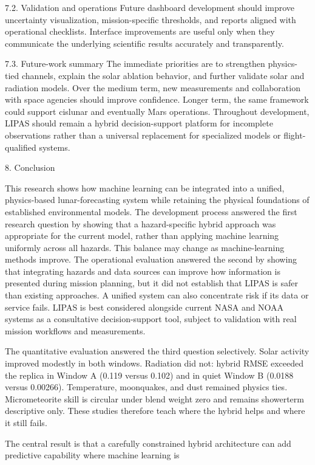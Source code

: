 7.2. Validation and operations Future dashboard development should improve uncertainty visualization, mission-specific thresholds, and reports aligned with operational checklists. Interface improvements are useful only when they communicate the underlying scientific results accurately and transparently.

7.3. Future-work summary The immediate priorities are to strengthen physics-tied channels, explain the solar ablation behavior, and further validate solar and radiation models. Over the medium term, new measurements and collaboration with space agencies should improve confidence. Longer term, the same framework could support cislunar and eventually Mars operations. Throughout development, LIPAS should remain a hybrid decision-support platform for incomplete observations rather than a universal replacement for specialized models or flight-qualified systems.

8. Conclusion

This research shows how machine learning can be integrated into a unified, physics-based lunar-forecasting system while retaining the physical foundations of established environmental models. The development process answered the first research question by showing that a hazard-specific hybrid approach was appropriate for the current model, rather than applying machine learning uniformly across all hazards. This balance may change as machine-learning methods improve. The operational evaluation answered the second by showing that integrating hazards and data sources can improve how information is presented during mission planning, but it did not establish that LIPAS is safer than existing approaches. A unified system can also concentrate risk if its data or service fails. LIPAS is best considered alongside current NASA and NOAA systems as a consultative decision-support tool, subject to validation with real mission workflows and measurements.

The quantitative evaluation answered the third question selectively. Solar activity improved modestly in both windows. Radiation did not: hybrid RMSE exceeded the replica in Window A (0.119 versus 0.102) and in quiet Window B (0.0188 versus 0.00266). Temperature, moonquakes, and dust remained physics ties. Micrometeorite skill is circular under blend weight zero and remains showerterm descriptive only. These studies therefore teach where the hybrid helps and where it still fails.

The central result is that a carefully constrained hybrid architecture can add predictive capability where machine learning is

